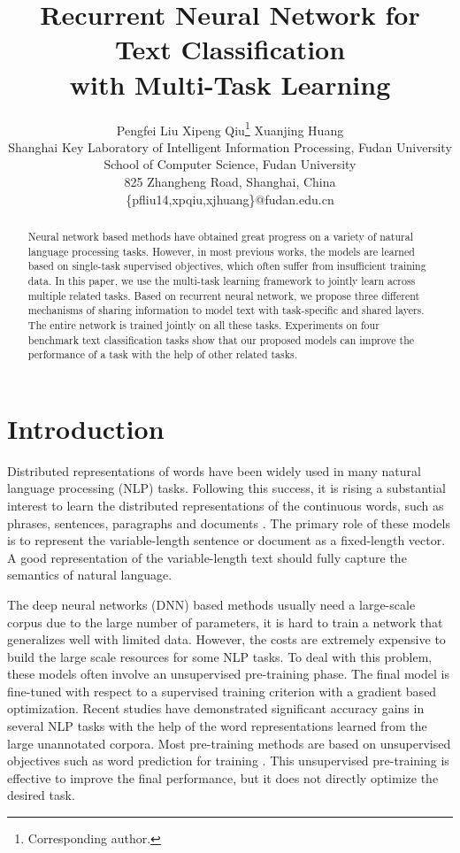 \documentclass{article}
\title{Recurrent Neural Network for Text Classification \\with Multi-Task Learning}
\author{Pengfei Liu \quad Xipeng Qiu\thanks{Corresponding author.} \quad Xuanjing Huang\\
Shanghai Key Laboratory of Intelligent Information Processing, Fudan University\\
School of Computer Science, Fudan University\\
825 Zhangheng Road, Shanghai, China\\
\{pfliu14,xpqiu,xjhuang\}@fudan.edu.cn}
\date{}
\begin{document}
\maketitle
\begin{abstract}
Neural network based methods have obtained great progress on a variety of natural language processing tasks. However, in most previous works, the models are learned based on single-task supervised objectives, which often suffer from insufficient training data. In this paper, we use the multi-task learning framework to jointly learn across multiple related tasks. Based on recurrent neural network, we propose three different mechanisms of sharing information to model text with task-specific and shared layers. The entire network is trained jointly on all these tasks. Experiments on four benchmark text classification tasks show that our proposed models can improve the performance of a task with the help of other related tasks.
\end{abstract}

\section{Introduction}

Distributed representations of words  have been widely used in many natural language processing (NLP) tasks. Following this success, it is rising a substantial interest to learn the distributed representations of the continuous words, such as phrases, sentences, paragraphs and documents \cite{socher2013recursive,le2014distributed,kalchbrenner2014convolutional,liu2015multitimescale}. The primary role of these models is to represent the variable-length sentence or document as a fixed-length vector. A good representation of the variable-length text should fully capture the semantics of natural language.



The deep neural networks (DNN) based methods usually need a large-scale corpus due to the large number of parameters, it is hard to train a network that generalizes well with limited data.  However, the costs are extremely expensive to build the large scale resources for some NLP tasks. To deal with this problem, these models often involve an unsupervised pre-training phase.  The final model is fine-tuned with respect to a supervised training criterion with a gradient based optimization.
Recent studies have demonstrated significant accuracy gains in several NLP tasks \cite{collobert2011natural} with the help of the word representations learned from the large unannotated corpora.
Most pre-training methods are based on unsupervised objectives such as word prediction for training \cite{collobert2011natural,turian2010word,mikolov2013efficient}. This unsupervised pre-training is effective to improve the final performance, but it does not directly optimize the desired task.
\end{document}
